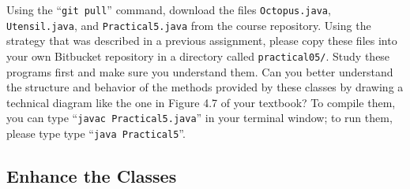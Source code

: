 \begin{sloppypar}
Using the ``{\tt git pull}'' command, download the files {\tt Octopus.java}, {\tt Utensil.java}, and {\tt Practical5.java}
from the course repository. Using the strategy that was described in a previous assignment, please copy these files into
your own Bitbucket repository in a directory called {\tt practical05/}. Study these programs first and make sure you
understand them. Can you better understand the structure and behavior of the methods provided by these classes by
drawing a technical diagram like the one in Figure 4.7 of your textbook? To compile them, you can type ``{\tt javac
  Practical5.java}'' in your terminal window; to run them, please type type ``{\tt java Practical5}''.
\end{sloppypar}

\vspace*{-.15in}
\subsection*{Enhance the Classes} 
\vspace*{-.05in}


